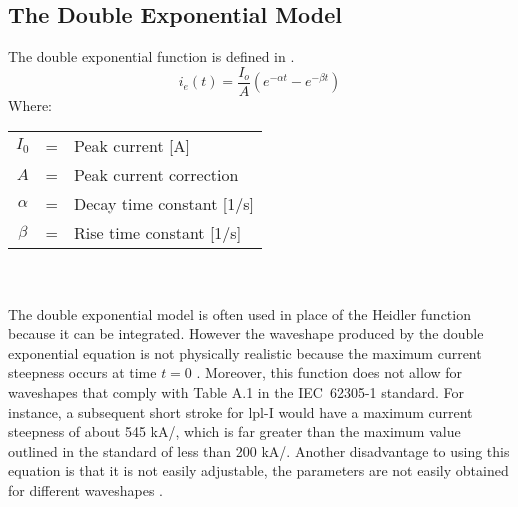 \subsection{The Double Exponential Model}
\label{sub:background_double_exponential}
The double exponential function is defined in .
\begin{equation}
    i_e \left( t \right) = \frac{I_o}{A}\left( e^{-\alpha t} - e^{-\beta t} \right)
    \label{eqn:dexp}
\end{equation}
Where: \\
\begin{tabular}{cll}
    $I_0$ & = & Peak current [A] \\
    $A$ & = & Peak current correction \\
    $\alpha$ & = & Decay time constant [1/s] \\
    $\beta$ & = & Rise time constant [1/s]
\end{tabular}\\\\
The double exponential model is often used in place of the Heidler function because it can be integrated. However the waveshape produced by the double exponential equation is not physically realistic because the maximum current steepness occurs at time $t=0$ \cite{ZhangFeizhouandLiuShanghe2002,Lovric2013,Heidler2002,Delfino2012}. Moreover, this function does not allow for waveshapes that comply with Table A.1 in the IEC~62305-1 standard. For instance, a subsequent short stroke for \gls{lpl}-I would have a maximum current steepness of about 545 kA/\usec, which is far greater than the maximum value outlined in the standard of less than 200 kA/\usec \cite{Heidler2008}. Another disadvantage to using this equation is that it is not easily adjustable, the parameters are not easily obtained for different waveshapes \cite{Javor2011}.

